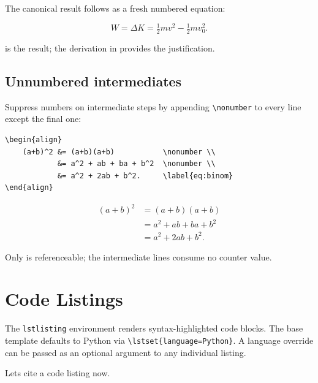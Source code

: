The canonical result follows as a fresh numbered equation:

\begin{equation}
    \label{eq:work_energy}
    W = \Delta K = \tfrac{1}{2}mv^2 - \tfrac{1}{2}mv_0^2.
\end{equation}

 is the result; the derivation in
 provides the justification.

\lipsum[1]

\subsection{Unnumbered intermediates}

Suppress numbers on intermediate steps by appending \verb|\nonumber|
to every line except the final one:

\begin{verbatim}
\begin{align}
    (a+b)^2 &= (a+b)(a+b)           \nonumber \\
            &= a^2 + ab + ba + b^2  \nonumber \\
            &= a^2 + 2ab + b^2.     \label{eq:binom}
\end{align}
\end{verbatim}

\begin{align}
    (a+b)^2 &= (a+b)(a+b)           \nonumber \\
            &= a^2 + ab + ba + b^2  \nonumber \\
            &= a^2 + 2ab + b^2.     \label{eq:binom}
\end{align}

Only  is referenceable; the intermediate lines
consume no counter value.

\lipsum[1]

\section{Code Listings} \label{sec:listings}

The \texttt{lstlisting} environment renders syntax-highlighted code blocks.
The base template defaults to Python via \verb|\lstset{language=Python}|.
A language override can be passed as an optional argument to any individual
listing.

Lets cite a code listing  now. \lipsum[1]

